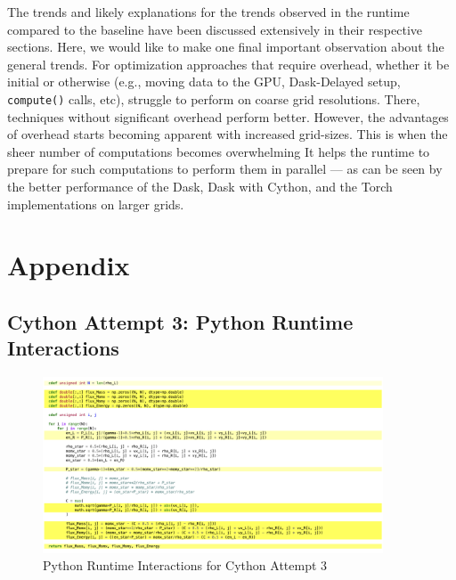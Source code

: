 \documentclass[a4paper,10pt]{article}
\begin{document}
The trends and likely explanations for the trends observed in the runtime compared to the baseline have been discussed extensively in their respective sections.
Here, we would like to make one final important observation about the general trends.
For optimization approaches that require overhead, whether it be initial or otherwise (e.g., moving data to the GPU, Dask-Delayed setup, \verb|compute()| calls, etc), struggle to perform on coarse grid resolutions.
There, techniques without significant overhead perform better.
However, the advantages of overhead starts becoming apparent with increased grid-sizes.
This is when the sheer number of computations becomes overwhelming
It helps the runtime to prepare for such computations to perform them in parallel --- as can be seen by the better performance of the Dask, Dask with Cython, and the Torch implementations on larger grids.

\newpage
\section{Appendix}
\subsection{Cython Attempt 3: Python Runtime Interactions}
\begin{figure}[H]
  \centering
  \includegraphics[width=0.9\textwidth]{images/misc/cython_attempt_3_annotated.png}
  \caption{Python Runtime Interactions for Cython Attempt 3}
  \label{fig:cython_attempt_3_annotated}
\end{figure}
\end{document}
